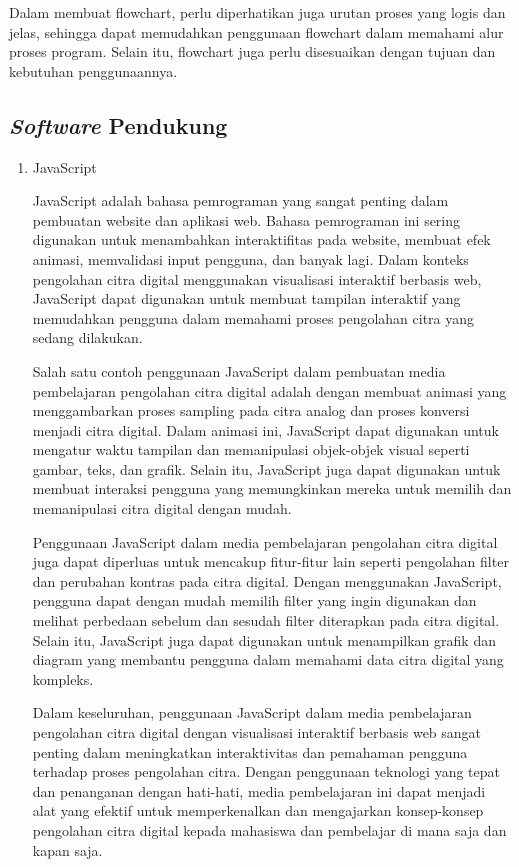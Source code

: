 \begin{enumerate}[leftmargin=1cm, itemindent=0.6cm,labelwidth=15pt, labelsep=5pt, listparindent=1cm,align=left]
    Dalam membuat flowchart, perlu diperhatikan juga urutan proses yang logis dan jelas, sehingga dapat memudahkan penggunaan flowchart dalam memahami alur proses program. Selain itu, flowchart juga perlu disesuaikan dengan tujuan dan kebutuhan penggunaannya.

\end{enumerate}

\subsection{\textit{Software} Pendukung}
\begin{enumerate}[leftmargin=1cm, itemindent=0.6cm,labelwidth=15pt, labelsep=5pt, listparindent=1cm,align=left]

\item JavaScript

    JavaScript adalah bahasa pemrograman yang sangat penting dalam pembuatan website dan aplikasi web. Bahasa pemrograman ini sering digunakan untuk menambahkan interaktifitas pada website, membuat efek animasi, memvalidasi input pengguna, dan banyak lagi. Dalam konteks pengolahan citra digital menggunakan visualisasi interaktif berbasis web, JavaScript dapat digunakan untuk membuat tampilan interaktif yang memudahkan pengguna dalam memahami proses pengolahan citra yang sedang dilakukan.

    Salah satu contoh penggunaan JavaScript dalam pembuatan media pembelajaran pengolahan citra digital adalah dengan membuat animasi yang menggambarkan proses sampling pada citra analog dan proses konversi menjadi citra digital. Dalam animasi ini, JavaScript dapat digunakan untuk mengatur waktu tampilan dan memanipulasi objek-objek visual seperti gambar, teks, dan grafik. Selain itu, JavaScript juga dapat digunakan untuk membuat interaksi pengguna yang memungkinkan mereka untuk memilih dan memanipulasi citra digital dengan mudah.

    Penggunaan JavaScript dalam media pembelajaran pengolahan citra digital juga dapat diperluas untuk mencakup fitur-fitur lain seperti pengolahan filter dan perubahan kontras pada citra digital. Dengan menggunakan JavaScript, pengguna dapat dengan mudah memilih filter yang ingin digunakan dan melihat perbedaan sebelum dan sesudah filter diterapkan pada citra digital. Selain itu, JavaScript juga dapat digunakan untuk menampilkan grafik dan diagram yang membantu pengguna dalam memahami data citra digital yang kompleks.

    Dalam keseluruhan, penggunaan JavaScript dalam media pembelajaran pengolahan citra digital dengan visualisasi interaktif berbasis web sangat penting dalam meningkatkan interaktivitas dan pemahaman pengguna terhadap proses pengolahan citra. Dengan penggunaan teknologi yang tepat dan penanganan dengan hati-hati, media pembelajaran ini dapat menjadi alat yang efektif untuk memperkenalkan dan mengajarkan konsep-konsep pengolahan citra digital kepada mahasiswa dan pembelajar di mana saja dan kapan saja.


\end{enumerate}
